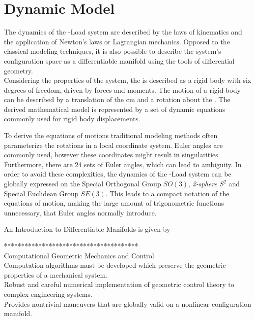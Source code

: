 \chapter{Dynamic Model} \label{ch:model}



The dynamics of the -Load system are described by the laws of kinematics and the application of Newton's laws or Lagrangian mechanics. Opposed to the classical modeling techniques, it is also possible to describe the system's configuration space as a differentiable manifold using the tools of differential geometry. \\

Considering the properties of the system, the  is described as a rigid body with six degrees of freedom, driven by forces and moments. The motion of a rigid body can be described by a translation of the \acf{cm} and a rotation about the . The derived mathematical model is represented by a set of dynamic equations commonly used for rigid body displacements. 

To derive the equations of motions traditional modeling methods often parameterize the rotations in a local coordinate system. Euler angles are commonly used, however these coordinates might result in singularities. Furthermore, there are 24 sets of Euler angles, which can lead to ambiguity. In order to avoid these complexities, the dynamics of the -Load system can be globally expressed on the Special Orthogonal Group $SO(3)$, \textit{2-sphere} $ S^2 $ and Special Euclidean Group $ SE(3) $. This leads to a compact notation of the equations of motion, making the large amount of trigonometric functions unnecessary, that Euler angles normally introduce.

An Introduction to Differentiable Manifolds is given by \cite{Boothby2003}

\cite{Bullo2005}
\cite{Jurdjevic1997}


***************************************\\
Computational Geometric Mechanics and Control\\
Computation algorithms must be developed which preserve the geometric properties of a mechanical system.\\
Robust and careful numerical implementation of geometric control theory to complex engineering systems.\\
Provides nontrivial maneuvers that are globally valid on a nonlinear configuration manifold.

